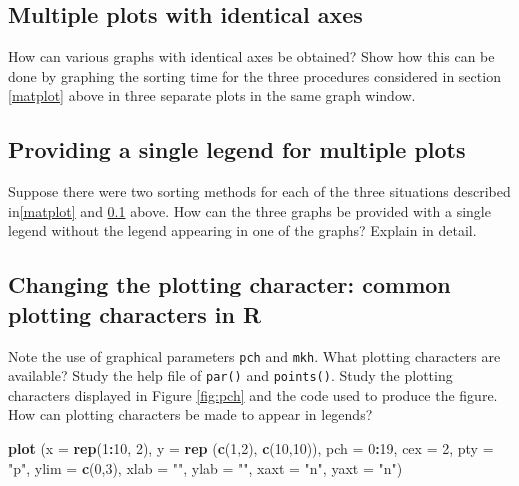 \documentclass[
]{book}
\newenvironment{Shaded}{\begin{snugshade}}{\end{snugshade}}
\newcommand{\AttributeTok}[1]{\textcolor[rgb]{0.13,0.29,0.53}{#1}}
\newcommand{\DecValTok}[1]{\textcolor[rgb]{0.00,0.00,0.81}{#1}}
\newcommand{\FunctionTok}[1]{\textcolor[rgb]{0.13,0.29,0.53}{\textbf{#1}}}
\newcommand{\NormalTok}[1]{#1}
\newcommand{\SpecialCharTok}[1]{\textcolor[rgb]{0.81,0.36,0.00}{\textbf{#1}}}
\newcommand{\StringTok}[1]{\textcolor[rgb]{0.31,0.60,0.02}{#1}}
\begin{document}
\subsection{Multiple plots with identical axes}\label{multAxes}

How can various graphs with identical axes be obtained? Show how this can be done by graphing the sorting time for the three procedures considered in section \ref{matplot} above in three separate plots in the same graph window.

\subsection{Providing a single legend for multiple plots}\label{providing-a-single-legend-for-multiple-plots}

Suppose there were two sorting methods for each of the three situations described in\ref{matplot} and \ref{multAxes} above. How can the three graphs be provided with a single legend without the legend appearing in one of the graphs? Explain in detail.

\subsection{Changing the plotting character: common plotting characters in R}\label{changing-the-plotting-character-common-plotting-characters-in-r}

Note the use of graphical parameters \texttt{pch} and \texttt{mkh}. What plotting characters are available? Study the help file of \texttt{par()} and \texttt{points()}. Study the plotting characters displayed in Figure \ref{fig:pch} and the code used to produce the figure. How can plotting characters be made to appear in legends?

\begin{Shaded}
\begin{Highlighting}[]
\FunctionTok{plot}\NormalTok{ (}\AttributeTok{x =} \FunctionTok{rep}\NormalTok{(}\DecValTok{1}\SpecialCharTok{:}\DecValTok{10}\NormalTok{, }\DecValTok{2}\NormalTok{), }\AttributeTok{y =} \FunctionTok{rep}\NormalTok{ (}\FunctionTok{c}\NormalTok{(}\DecValTok{1}\NormalTok{,}\DecValTok{2}\NormalTok{), }\FunctionTok{c}\NormalTok{(}\DecValTok{10}\NormalTok{,}\DecValTok{10}\NormalTok{)), }\AttributeTok{pch =} \DecValTok{0}\SpecialCharTok{:}\DecValTok{19}\NormalTok{, }\AttributeTok{cex =} \DecValTok{2}\NormalTok{, }
      \AttributeTok{pty =} \StringTok{"p"}\NormalTok{, }\AttributeTok{ylim =} \FunctionTok{c}\NormalTok{(}\DecValTok{0}\NormalTok{,}\DecValTok{3}\NormalTok{), }\AttributeTok{xlab =} \StringTok{""}\NormalTok{, }\AttributeTok{ylab =} \StringTok{""}\NormalTok{, }\AttributeTok{xaxt =} \StringTok{"n"}\NormalTok{, }\AttributeTok{yaxt =} \StringTok{"n"}\NormalTok{)}
\end{Highlighting}
\end{Shaded}
\end{document}
